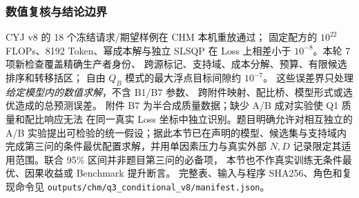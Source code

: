 \subsubsection{数值复核与结论边界}
CYJ v8 的 18 个冻结请求/期望样例在 CHM 本机重放通过；
固定配方的 $10^{22}$ FLOPs、8192 Token、幂成本解与独立 SLSQP
在 Loss 上相差小于 $10^{-8}$。本轮 7 项新检查覆盖精确生产者身份、
跨源标记、支持域、成本分解、预算、有限候选排序和转移括区；
自由 $Q_B$ 模式的最大浮点目标间隙约 $10^{-7}$。
这些误差界只处理\emph{给定模型内的数值求解}，不含 B1/B7 参数、
跨附件映射、配比桥、模型形式或选优造成的总预测误差。
附件 B7 为半合成质量数据；缺少 A/B 成对实验使 Q1 质量和配比响应无法
在同一真实 Loss 坐标中独立识别。题目明确允许对相互独立的 A/B
实验提出可检验的统一假设；据此本节已在声明的模型、候选集与支持域内
完成第三问的条件最优配置求解，并用单因素压力与真实外部 $N,D$
记录限定其适用范围。联合 95\% 区间并非题目第三问的必备项，
本节也不作真实训练无条件最优、因果收益或 Benchmark 提升断言。
完整表、输入与程序 SHA256、角色和复现命令见
\texttt{outputs/chm/q3\_conditional\_v8/manifest.json}。
